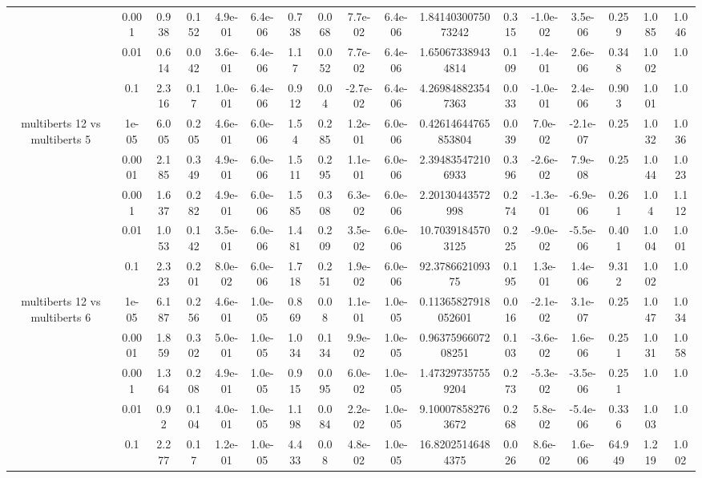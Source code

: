 \begin{tabular}{|c|c|c|c|c|c|c|c|c|c|c|c|c|c|c|c|c|}
 & 0.001 & 0.938 & 0.152 & 4.9e-01 & 6.4e-06 & 0.738 & 0.068 & 7.7e-02 & 6.4e-06 & 1.8414030075073242 & 0.315 & -1.0e-02 & 3.5e-06 & 0.259 & 1.085 & 1.046 \\
 & 0.01 & 0.614 & 0.042 & 3.6e-01 & 6.4e-06 & 1.17 & 0.052 & 7.7e-02 & 6.4e-06 & 1.650673389434814 & 0.109 & -1.4e-01 & 2.6e-06 & 0.348 & 1.002 & 1.0 \\
 & 0.1 & 2.316 & 0.17 & 1.0e-01 & 6.4e-06 & 0.912 & 0.04 & -2.7e-02 & 6.4e-06 & 4.269848823547363 & 0.033 & -1.0e-01 & 2.4e-06 & 0.903 & 1.001 & 1.0 \\
\hline
\multirow{5}{*}{multiberts 12 vs multiberts 5} & 1e-05 & 6.005 & 0.205 & 4.6e-01 & 6.0e-06 & 1.54 & 0.285 & 1.2e-01 & 6.0e-06 & 0.42614644765853804 & 0.039 & 7.0e-02 & -2.1e-07 & 0.25 & 1.032 & 1.036 \\
 & 0.0001 & 2.185 & 0.349 & 4.9e-01 & 6.0e-06 & 1.511 & 0.295 & 1.1e-01 & 6.0e-06 & 2.394835472106933 & 0.396 & -2.6e-02 & 7.9e-08 & 0.25 & 1.044 & 1.023 \\
 & 0.001 & 1.637 & 0.282 & 4.9e-01 & 6.0e-06 & 1.585 & 0.308 & 6.3e-02 & 6.0e-06 & 2.20130443572998 & 0.274 & -1.3e-01 & -6.9e-06 & 0.261 & 1.04 & 1.112 \\
 & 0.01 & 1.053 & 0.142 & 3.5e-01 & 6.0e-06 & 1.481 & 0.209 & 3.5e-02 & 6.0e-06 & 10.70391845703125 & 0.225 & -9.0e-02 & -5.5e-06 & 0.401 & 1.004 & 1.001 \\
 & 0.1 & 2.323 & 0.201 & 8.0e-02 & 6.0e-06 & 1.718 & 0.251 & 1.9e-02 & 6.0e-06 & 92.378662109375 & 0.195 & 1.3e-01 & 1.4e-06 & 9.312 & 1.002 & 1.0 \\
\hline
\multirow{5}{*}{multiberts 12 vs multiberts 6} & 1e-05 & 6.187 & 0.256 & 4.6e-01 & 1.0e-05 & 0.869 & 0.08 & 1.1e-01 & 1.0e-05 & 0.11365827918052601 & 0.016 & -2.1e-02 & 3.1e-07 & 0.25 & 1.047 & 1.034 \\
 & 0.0001 & 1.859 & 0.302 & 5.0e-01 & 1.0e-05 & 1.034 & 0.134 & 9.9e-02 & 1.0e-05 & 0.9637596607208251 & 0.103 & -3.6e-02 & 1.6e-06 & 0.251 & 1.031 & 1.058 \\
 & 0.001 & 1.364 & 0.208 & 4.9e-01 & 1.0e-05 & 0.915 & 0.095 & 6.0e-02 & 1.0e-05 & 1.473297357559204 & 0.273 & -5.3e-02 & -3.5e-06 & 0.251 & 1.0 & 1.0 \\
 & 0.01 & 0.92 & 0.104 & 4.0e-01 & 1.0e-05 & 1.198 & 0.084 & 2.2e-02 & 1.0e-05 & 9.100078582763672 & 0.268 & 5.8e-02 & -5.4e-06 & 0.336 & 1.003 & 1.0 \\
 & 0.1 & 2.277 & 0.17 & 1.2e-01 & 1.0e-05 & 4.433 & 0.08 & 4.8e-02 & 1.0e-05 & 16.82025146484375 & 0.026 & 8.6e-02 & 1.6e-06 & 64.949 & 1.219 & 1.002 \\

\end{tabular}
